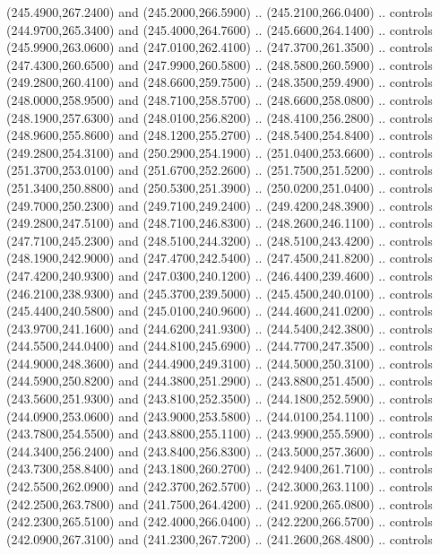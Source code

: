 {\begin{scope}[y=0.80pt, x=0.80pt, yscale=-1, xscale=1, inner sep=0pt, outer sep=0pt, #1]
      (245.4900,267.2400) and (245.2000,266.5900) .. (245.2100,266.0400) .. controls
      (244.9700,265.3400) and (245.4000,264.7600) .. (245.6600,264.1400) .. controls
      (245.9900,263.0600) and (247.0100,262.4100) .. (247.3700,261.3500) .. controls
      (247.4300,260.6500) and (247.9900,260.5800) .. (248.5800,260.5900) .. controls
      (249.2800,260.4100) and (248.6600,259.7500) .. (248.3500,259.4900) .. controls
      (248.0000,258.9500) and (248.7100,258.5700) .. (248.6600,258.0800) .. controls
      (248.1900,257.6300) and (248.0100,256.8200) .. (248.4100,256.2800) .. controls
      (248.9600,255.8600) and (248.1200,255.2700) .. (248.5400,254.8400) .. controls
      (249.2800,254.3100) and (250.2900,254.1900) .. (251.0400,253.6600) .. controls
      (251.3700,253.0100) and (251.6700,252.2600) .. (251.7500,251.5200) .. controls
      (251.3400,250.8800) and (250.5300,251.3900) .. (250.0200,251.0400) .. controls
      (249.7000,250.2300) and (249.7100,249.2400) .. (249.4200,248.3900) .. controls
      (249.2800,247.5100) and (248.7100,246.8300) .. (248.2600,246.1100) .. controls
      (247.7100,245.2300) and (248.5100,244.3200) .. (248.5100,243.4200) .. controls
      (248.1900,242.9000) and (247.4700,242.5400) .. (247.4500,241.8200) .. controls
      (247.4200,240.9300) and (247.0300,240.1200) .. (246.4400,239.4600) .. controls
      (246.2100,238.9300) and (245.3700,239.5000) .. (245.4500,240.0100) .. controls
      (245.4400,240.5800) and (245.0100,240.9600) .. (244.4600,241.0200) .. controls
      (243.9700,241.1600) and (244.6200,241.9300) .. (244.5400,242.3800) .. controls
      (244.5500,244.0400) and (244.8100,245.6900) .. (244.7700,247.3500) .. controls
      (244.9000,248.3600) and (244.4900,249.3100) .. (244.5000,250.3100) .. controls
      (244.5900,250.8200) and (244.3800,251.2900) .. (243.8800,251.4500) .. controls
      (243.5600,251.9300) and (243.8100,252.3500) .. (244.1800,252.5900) .. controls
      (244.0900,253.0600) and (243.9000,253.5800) .. (244.0100,254.1100) .. controls
      (243.7800,254.5500) and (243.8800,255.1100) .. (243.9900,255.5900) .. controls
      (244.3400,256.2400) and (243.8400,256.8300) .. (243.5000,257.3600) .. controls
      (243.7300,258.8400) and (243.1800,260.2700) .. (242.9400,261.7100) .. controls
      (242.5500,262.0900) and (242.3700,262.5700) .. (242.3000,263.1100) .. controls
      (242.2500,263.7800) and (241.7500,264.4200) .. (241.9200,265.0800) .. controls
      (242.2300,265.5100) and (242.4000,266.0400) .. (242.2200,266.5700) .. controls
      (242.0900,267.3100) and (241.2300,267.7200) .. (241.2600,268.4800) .. controls

\end{scope}}
